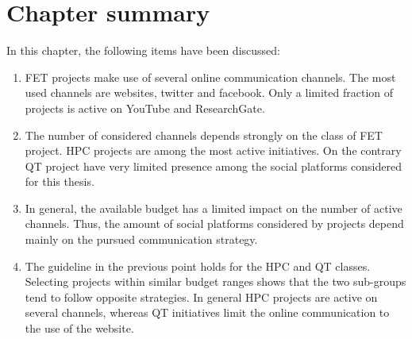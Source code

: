 \section{Chapter summary} 
In this chapter, the following items have been discussed:

\begin{enumerate}
 \item FET projects make use of several online communication channels. The most used channels are websites, twitter and facebook. Only a limited fraction of projects is active on YouTube and ResearchGate.
 \item The number of considered channels depends strongly on the class of FET project. HPC projects are among the most active initiatives. On the contrary QT project have very limited presence among the social platforms considered for this thesis.
 \item In general, the available budget has a limited impact on the number of active channels. Thus, the amount of social platforms considered by projects depend mainly on the pursued communication strategy.
 \item The guideline in the previous point holds for the HPC and QT classes. Selecting projects within similar budget ranges shows that the two sub-groups tend to follow opposite strategies. In general HPC projects are active on several channels, whereas QT initiatives limit the online communication to the use of the website.       
\end{enumerate}